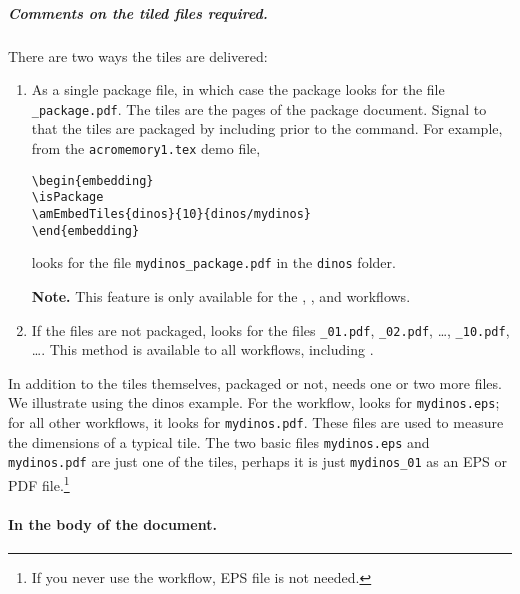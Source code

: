 \documentclass{article}
\edef\amtIndent{\the\parindent}
\begin{document}
\subparagraph*{Comments on the tiled files required.} There are two ways the tiles
are delivered:
\begin{enumerate}
  \item As a single package file, in which case the  package
      looks for the file \texttt{\_package.pdf}. The tiles are
      the pages of the package document. Signal to  that the tiles
      are packaged by including  prior to the  command.
      For example, from the \texttt{acromemory1.tex} demo file,
\begin{Verbatim}[xleftmargin=\amtIndent]
\begin{embedding}
\isPackage
\amEmbedTiles{dinos}{10}{dinos/mydinos}
\end{embedding}
\end{Verbatim}
     looks for the file \texttt{mydinos\_package.pdf} in the
    \texttt{dinos} folder.

    \textbf{Note.} This feature is only available for the , ,
    and  workflows.
  \item If the files are not packaged,  looks for the files
    \texttt{\_01.pdf}, \texttt{\_02.pdf}, \dots, \texttt{\_10.pdf}, \dots.
    This method is available to all workflows, including .
\end{enumerate}
In addition to the tiles themselves, packaged or not,  needs
one or two more files. We illustrate using the dinos example. For the
 workflow,  looks for
\texttt{mydinos.eps}; for all other workflows, it looks for
\texttt{mydinos.pdf}. These files are used to measure the dimensions of a
typical tile. The two basic files \texttt{mydinos.eps} and
\texttt{mydinos.pdf} are just one of the tiles, perhaps it is just
\texttt{mydinos\_01} as an EPS or PDF file.\footnote{If you never use the
 workflow, EPS file is not needed.}


\paragraph*{In the body of the document.}
\end{document}
